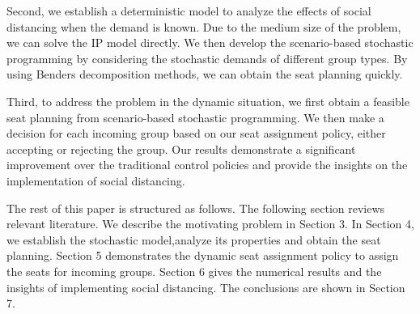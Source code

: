 Second, we establish a deterministic model to analyze the effects of social distancing when the demand is known. Due to the medium size of the problem, we can solve the IP model directly. We then develop the scenario-based stochastic programming by considering the stochastic demands of different group types. By using Benders decomposition methods, we can obtain the seat planning quickly. 

Third, to address the problem in the dynamic situation, we first obtain a feasible seat planning from scenario-based stochastic programming. We then make a decision for each incoming group based on our seat assignment policy, either accepting or rejecting the group. Our results demonstrate a significant improvement over the traditional control policies and provide the insights on the implementation of social distancing.



The rest of this paper is structured as follows. The following section reviews relevant literature. We describe the motivating problem in Section 3. In Section 4, we establish the stochastic model,analyze its properties and obtain the seat planning. Section 5 demonstrates the dynamic seat assignment policy to assign the seats for incoming groups. Section 6 gives the numerical results and the insights of implementing social distancing. The conclusions are shown in Section 7.
\newpage
